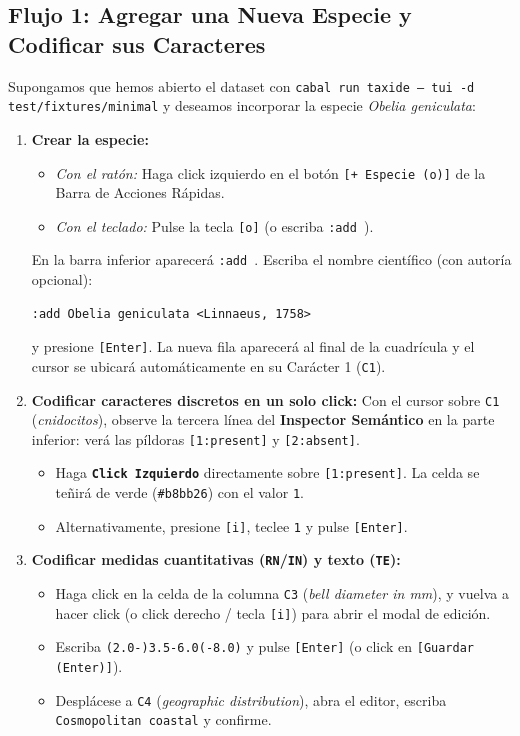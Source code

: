 \documentclass[11pt,a4paper]{article}
\newcommand{\keystroke}[1]{\texttt{[#1]}}
\newcommand{\mousebtn}[1]{\textbf{\texttt{#1}}}
\begin{document}
\subsection{Flujo 1: Agregar una Nueva Especie y Codificar sus Caracteres}
Supongamos que hemos abierto el dataset con \texttt{cabal run taxide -- tui -d test/fixtures/minimal} y deseamos incorporar la especie \textit{Obelia geniculata}:

\begin{enumerate}
    \item \textbf{Crear la especie:}
    \begin{itemize}
        \item \textit{Con el ratón:} Haga click izquierdo en el botón \texttt{[+ Especie (o)]} de la Barra de Acciones Rápidas.
        \item \textit{Con el teclado:} Pulse la tecla \keystroke{o} (o escriba \texttt{:add }).
    \end{itemize}
    En la barra inferior aparecerá \texttt{:add }. Escriba el nombre científico (con autoría opcional):
    \begin{lstlisting}
:add Obelia geniculata <Linnaeus, 1758>
    \end{lstlisting}
    y presione \keystroke{Enter}. La nueva fila aparecerá al final de la cuadrícula y el cursor se ubicará automáticamente en su Carácter 1 (\texttt{C1}).

    \item \textbf{Codificar caracteres discretos en un solo click:}
    Con el cursor sobre \texttt{C1} (\textit{cnidocitos}), observe la tercera línea del \textbf{Inspector Semántico} en la parte inferior: verá las píldoras \texttt{[1:present]} y \texttt{[2:absent]}.
    \begin{itemize}
        \item Haga \mousebtn{Click Izquierdo} directamente sobre \texttt{[1:present]}. La celda se teñirá de verde (\texttt{\#b8bb26}) con el valor \texttt{1}.
        \item Alternativamente, presione \keystroke{i}, teclee \texttt{1} y pulse \keystroke{Enter}.
    \end{itemize}

    \item \textbf{Codificar medidas cuantitativas (\texttt{RN}/\texttt{IN}) y texto (\texttt{TE}):}
    \begin{itemize}
        \item Haga click en la celda de la columna \texttt{C3} (\textit{bell diameter in mm}), y vuelva a hacer click (o click derecho / tecla \keystroke{i}) para abrir el modal de edición.
        \item Escriba \texttt{(2.0-)3.5-6.0(-8.0)} y pulse \keystroke{Enter} (o click en \texttt{[Guardar (Enter)]}).
        \item Desplácese a \texttt{C4} (\textit{geographic distribution}), abra el editor, escriba \texttt{Cosmopolitan coastal} y confirme.
    \end{itemize}


\end{enumerate}
\end{document}
